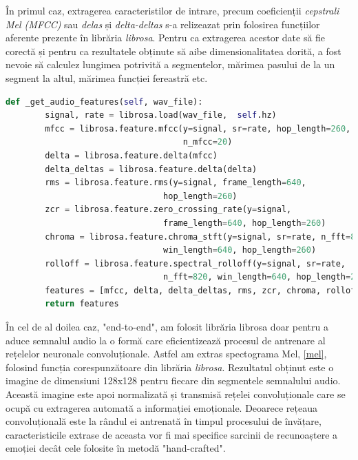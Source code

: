 \documentclass[a4paper,12pt]{book}
\begin{document}
				În primul caz, extragerea caracteristilor de intrare, precum coeficienții \textit{cepstrali Mel (MFCC)} sau \textit{delas} și \textit{delta-deltas} s-a relizeazat prin folosirea funcțiilor aferente prezente în librăria \textit{librosa}. Pentru ca extragerea acestor date să fie corectă și pentru ca rezultatele obținute să aibe dimensionalitatea dorită, a fost nevoie să calculez lungimea potrivită a segmentelor, mărimea pasului de la un segment la altul, mărimea funcției fereastră etc. \par
				
				\begin{lstlisting}[language=Python, caption={Extragerea caracteristicilor "hand-crafted", 3.3, folosind libraria librosa.}, xleftmargin=0cm]
 def _get_audio_features(self, wav_file):
		signal, rate = librosa.load(wav_file,  self.hz)
		mfcc = librosa.feature.mfcc(y=signal, sr=rate, hop_length=260, 
									n_mfcc=20)
		delta = librosa.feature.delta(mfcc)
		delta_deltas = librosa.feature.delta(delta)
		rms = librosa.feature.rms(y=signal, frame_length=640, 
								hop_length=260)
		zcr = librosa.feature.zero_crossing_rate(y=signal, 
								frame_length=640, hop_length=260)
		chroma = librosa.feature.chroma_stft(y=signal, sr=rate, n_fft=820, 
								win_length=640,	hop_length=260)
		rolloff = librosa.feature.spectral_rolloff(y=signal, sr=rate, 
								n_fft=820, win_length=640, hop_length=260)
		features = [mfcc, delta, delta_deltas, rms, zcr, chroma, rolloff]
		return features	\end{lstlisting}
				
				În cel de al doilea caz, "end-to-end", am folosit librăria librosa doar pentru a aduce semnalul audio la o formă care eficientizează procesul de antrenare al rețelelor neuronale convoluționale. Astfel am extras spectograma Mel, \ref{mel}, folosind funcția corespunzătoare din librăria \textit{librosa}. Rezultatul obținut este o imagine de dimensiuni 128x128 pentru fiecare din segmentele semnalului audio. Această imagine este apoi normalizată și transmisă rețelei convoluționale care se ocupă cu extragerea automată a informației emoționale. Deoarece rețeaua convoluțională este la rândul ei antrenată în timpul procesului de învățare, caracteristicile extrase de aceasta vor fi mai specifice sarcinii de recunoaștere a emoției decât cele folosite în metodă "hand-crafted". \par
				
\end{document}
